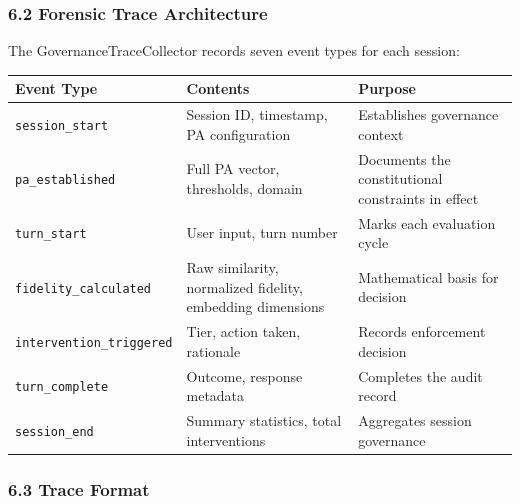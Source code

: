 \subsubsection{6.2 Forensic Trace
Architecture}\label{forensic-trace-architecture}

The GovernanceTraceCollector records seven event types for each session:

{\def\LTcaptype{none} %
\begin{longtable}[]{@{}
  >{\raggedright\arraybackslash}p{}
  >{\raggedright\arraybackslash}p{}
  >{\raggedright\arraybackslash}p{}@{}}
\toprule\noalign{}
\begin{minipage}[b]{\linewidth}\raggedright
Event Type
\end{minipage} & \begin{minipage}[b]{\linewidth}\raggedright
Contents
\end{minipage} & \begin{minipage}[b]{\linewidth}\raggedright
Purpose
\end{minipage} \\
\midrule\noalign{}
\endhead
\bottomrule\noalign{}
\endlastfoot
\texttt{session\_start} & Session ID, timestamp, PA configuration &
Establishes governance context \\
\texttt{pa\_established} & Full PA vector, thresholds, domain &
Documents the constitutional constraints in effect \\
\texttt{turn\_start} & User input, turn number & Marks each evaluation
cycle \\
\texttt{fidelity\_calculated} & Raw similarity, normalized fidelity,
embedding dimensions & Mathematical basis for decision \\
\texttt{intervention\_triggered} & Tier, action taken, rationale &
Records enforcement decision \\
\texttt{turn\_complete} & Outcome, response metadata & Completes the
audit record \\
\texttt{session\_end} & Summary statistics, total interventions &
Aggregates session governance \\
\end{longtable}
}

\subsubsection{6.3 Trace Format}\label{trace-format}

